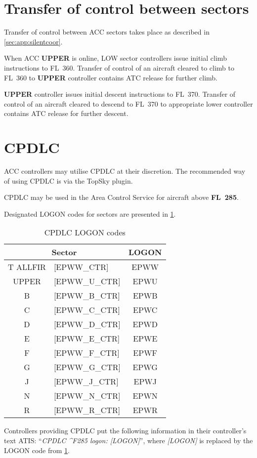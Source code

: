 \section{Transfer of control between sectors}

Transfer of control between ACC sectors takes place as described in
\cref{sec:app:silentcoor}.

When ACC \textbf{\color{OliveGreen}UPPER\color{black}} is online, LOW sector controllers
issue initial climb instructions to FL~360. Transfer of control of an aircraft
cleared to climb to FL~360 to \textbf{\color{OliveGreen}UPPER\color{black}} controller
contains ATC release for further climb.

\textbf{\color{OliveGreen}UPPER\color{black}} controller issues initial descent
instructions to FL~370. Transfer of control of an aircraft cleared to descend to
FL~370 to appropriate lower controller contains ATC release for further descent.

\section{CPDLC}
\label{sec:acc:cpdlc}

ACC controllers may utilise CPDLC at their discretion. The recommended way of
using CPDLC is via the TopSky plugin.

CPDLC may be used in the Area Control Service for aircraft above
\textbf{FL~285}.

Designated LOGON codes for sectors are presented in \cref{tab:acc:cpdlc}.

\begin{table}[htbp]
  \centering
  \begin{tabular}{|c l|c|}
    \hline
    \multicolumn{2}{|c|}{\cellcolor{vred}\color{white}\textbf{Sector}}&\cellcolor{vred}\color{white}\textbf{LOGON}\\\hline
    \color{Orange}T ALLFIR & \tiny [EPWW\_CTR] & EPWW\\\hline
    \color{OliveGreen}UPPER & \tiny [EPWW\_U\_CTR] & EPWU\\\hline
    \color{ProcessBlue}B & \tiny [EPWW\_B\_CTR] & EPWB\\\hline
    \color{Orange}C & \tiny [EPWW\_C\_CTR] & EPWC\\\hline
    \color{Orange}D & \tiny [EPWW\_D\_CTR] & EPWD\\\hline
    \color{MidnightBlue}E & \tiny [EPWW\_E\_CTR] & EPWE\\\hline
    \color{ProcessBlue}F & \tiny [EPWW\_F\_CTR] & EPWF\\\hline
    \color{ProcessBlue}G & \tiny [EPWW\_G\_CTR] & EPWG\\\hline
    \color{vred}J & \tiny [EPWW\_J\_CTR] & EPWJ\\\hline
    \color{MidnightBlue}N & \tiny [EPWW\_N\_CTR] & EPWN\\\hline
    \color{vred}R & \tiny [EPWW\_R\_CTR] & EPWR\\\hline
  \end{tabular}
  \caption{CPDLC LOGON codes}
  \label{tab:acc:cpdlc}
\end{table}

Controllers providing CPDLC put the following information in their controller's
text ATIS: ``\textit{CPDLC \^{}F285 logon: [LOGON]}'', where \textit{[LOGON]} is
replaced by the LOGON code from \cref{tab:acc:cpdlc}.

